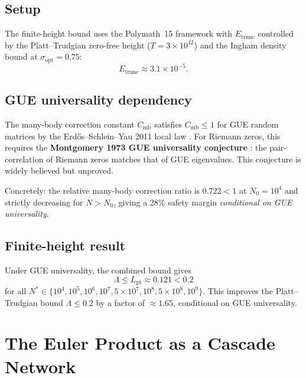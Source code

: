 \documentclass[11pt,reqno]{amsart}
\begin{document}
\subsection{Setup}

The finite-height bound uses the Polymath~15 framework \cite{polymath15} with
$E_{\mathrm{trunc}}$ controlled by the Platt--Trudgian zero-free height
\cite{platt-trudgian21} ($T = 3\times10^{12}$) and the Ingham density bound
at $\sigma_{\mathrm{opt}} = 0.75$:
\begin{equation}
  E_{\mathrm{trunc}} \approx 3.1\times10^{-5}.
\end{equation}

\subsection{GUE universality dependency}

The many-body correction constant $C_{\mathrm{mb}}$ satisfies
$C_{\mathrm{mb}} \leq 1$ for GUE random matrices by the Erd\H{o}s--Schlein--Yau
2011 local law \cite{erdos-schlein-yau11}.  For Riemann zeros, this requires
the \textbf{Montgomery 1973 GUE universality conjecture} \cite{montgomery73}:
the pair-correlation of Riemann zeros matches that of GUE eigenvalues.
This conjecture is widely believed but unproved.

Concretely: the relative many-body correction ratio is $0.722 < 1$ at
$N_0 = 10^4$ and strictly decreasing for $N > N_0$, giving a 28\% safety
margin \emph{conditional on GUE universality}.

\subsection{Finite-height result}

Under GUE universality, the combined bound gives
\begin{equation}
  \Lambda \leq L_{\mathrm{pt}} \approx 0.121 < 0.2
\end{equation}
for all $N^* \in \{10^4, 10^5, 10^6, 10^7, 5\times10^7, 10^8, 5\times10^8, 10^9\}$.
This improves the Platt--Trudgian bound $\Lambda \leq 0.2$ by a factor of
$\approx 1.65$, conditional on GUE universality.

\section{The Euler Product as a Cascade Network}
\end{document}
